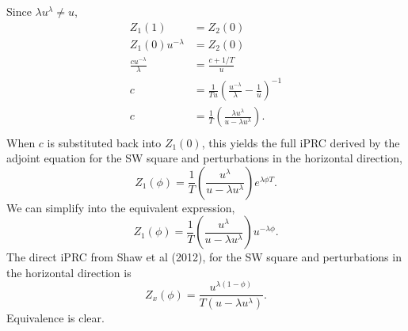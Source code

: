 \documentclass[a4paper,12pt]{article}
\begin{document}
Since $\lambda u^\lambda \neq u$,
\begin{equation}
\begin{split}
 Z_1(1) &= Z_2(0)\\
Z_1(0)u^{-\lambda} &= Z_2(0)\\
  \frac{c u^{-\lambda}}{\lambda}  &= \frac{c+1/T}{u}\\
 c  &= \frac{1}{Tu}  \left (\frac{u^{-\lambda}}{\lambda}  -  \frac{1}{u}\right )^{-1}\\
 c  &= \frac{1}{T}  \left (\frac{\lambda u^\lambda}{u - \lambda u^\lambda}\right ).\\
 \end{split}
\end{equation}
When $c$ is substituted back into $Z_1(0)$, this yields the full iPRC derived by the adjoint equation for the SW square and perturbations in the horizontal direction,
\begin{equation}
Z_1(\phi) = \frac{1}{T}  \left (\frac{u^\lambda}{u - \lambda u^\lambda}\right ) e^{\lambda \phi T}.
\end{equation}
We can simplify into the equivalent expression,
\begin{equation}
Z_1(\phi) = \frac{1}{T}  \left (\frac{u^\lambda}{u- \lambda u^\lambda}\right ) u^{-\lambda \phi}.
\end{equation}
The direct iPRC from Shaw et al (2012), for the SW square and perturbations in the horizontal direction is
\begin{equation}
Z_x(\phi) = \frac{u^{\lambda(1-\phi)}}{T(u-\lambda u^\lambda)}.
\end{equation}
Equivalence is clear.
\end{document}
